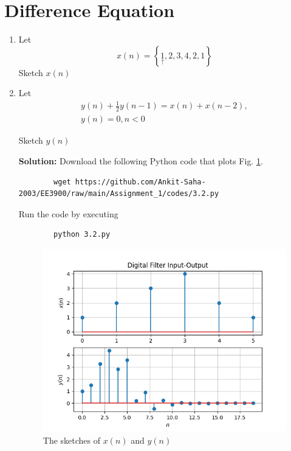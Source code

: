 \documentclass[journal,12pt,twocolumn]{IEEEtran}
\newcommand{\solution}{\noindent \textbf{Solution: }}
\providecommand{\cbrak}[1]{\ensuremath{\left\{#1\right\}}}
\numberwithin{equation}{section}
\renewcommand\thesection{\arabic{section}}
\begin{document}
	\section{Difference Equation}
	\begin{enumerate}[label=\thesection.\arabic*,ref=\thesection.\theenumi]
	\item Let
	\begin{equation}
		x(n) = \cbrak{\underset{\uparrow}{1},2,3,4,2,1}
	\end{equation}
	Sketch $x(n)$
	\item Let
	\begin{multline}
		\label{eq:iir_filter}
		y(n) + \frac{1}{2}y(n-1) = x(n) + x(n-2), \\
 		y(n) = 0, n < 0
	\end{multline}
	
	Sketch $y(n)$

	\solution Download the following Python code that plots Fig. \ref{fig-3.2}.
	\begin{lstlisting}
		wget https://github.com/Ankit-Saha-2003/EE3900/raw/main/Assignment_1/codes/3.2.py
	\end{lstlisting}
	
	Run the code by executing
	\begin{lstlisting}
		python 3.2.py
	\end{lstlisting}

	\begin{figure}[!ht]
		\centering
		\includegraphics[width=\columnwidth]{./figs/3.2.png}
		\caption{The sketches of $x(n)$ and $y(n)$}
		\label{fig-3.2}	
	\end{figure}
	\end{enumerate}
	
\end{document}
